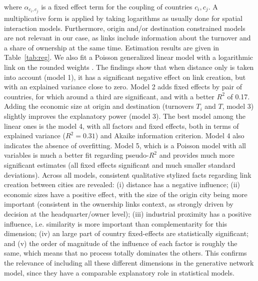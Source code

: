 \documentclass[10pt,letterpaper]{article}
\begin{document}
where $\alpha_{c_i,c_j}$ is a fixed effect term for the coupling of countries $c_i,c_j$. A multiplicative form is applied by taking logarithms as usually done for spatial interaction models. Furthermore, origin and/or destination constrained models are not relevant in our case, as links include information about the turnover and a share of ownership at the same time. Estimation results are given in Table~\ref{tab:reg}. We also fit a Poisson generalized linear model with a logarithmic link on the rounded weights \cite{flowerdew1988fitting}. The findings show that when distance only is taken into account (model 1), it has a significant negative effect on link creation, but with an explained variance close to zero. Model 2 adds fixed effects by pair of countries, for which around a third are significant, and with a better $R^2$ of 0.17. Adding the economic size at origin and destination (turnovers $T_i$ and $T$, model 3) slightly improves the explanatory power (model 3). The best model among the linear ones is the model 4, with all factors and fixed effects, both in terms of explained variance ($R^2 = 0.31$) and Akaike information criterion. Model 4 also indicates the absence of overfitting. Model 5, which is a Poisson model with all variables is much a better fit regarding pseudo-$R^2$ and provides much more significant estimates (all fixed effects significant and much smaller standard deviations). Across all models, consistent qualitative stylized facts regarding link creation between cities are revealed: (i) distance has a negative influence; (ii) economic sizes have a positive effect, with the size of the origin city being more important (consistent in the ownership links context, as strongly driven by decision at the headquarter/owner level); (iii) industrial proximity has a positive influence, i.e. similarity is more important than complementarity for this dimension; (iv) an large part of country fixed-effects are statistically significant; and (v) the order of magnitude of the influence of each factor is roughly the same, which means that no process totally dominates the others.
This confirms the relevance of including all these different dimensions in the generative network model, since they have a comparable explanatory role in statistical models.
\end{document}
